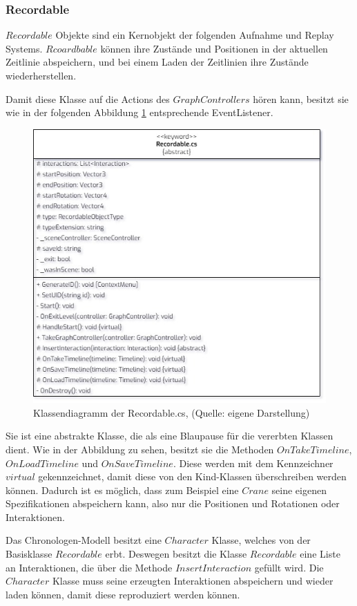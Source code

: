 \subsubsection{Recordable}
$Recordable$ Objekte sind ein Kernobjekt der folgenden Aufnahme und Replay Systems. $Rcoardbable$ können ihre Zustände und Positionen in der aktuellen Zeitlinie abspeichern, und bei einem Laden der Zeitlinien ihre Zustände wiederherstellen.

Damit diese Klasse auf die Actions des $GraphControllers$ hören kann, besitzt sie wie in der folgenden Abbildung \ref{fig:recordable-cs} entsprechende EventListener.

\begin{figure}[ht]
\centering
\includegraphics[width=0.6\linewidth]{content/pictures/Recordable.jpg}
\caption{Klassendiagramm der Recordable.cs, (Quelle: eigene Darstellung)}
\label{fig:recordable-cs}
\end{figure}

Sie ist eine abstrakte Klasse, die als eine Blaupause für die vererbten Klassen dient. Wie in der Abbildung zu sehen, besitzt sie die Methoden $OnTakeTimeline$, \\ $OnLoadTimeline$ und $OnSaveTimeline$. Diese werden mit dem Kennzeichner $virtual$ gekennzeichnet, damit diese von den Kind-Klassen überschreiben werden können. Dadurch ist es möglich, dass zum Beispiel eine $Crane$ seine eigenen Spezifikationen abspeichern kann, also nur die Positionen und Rotationen oder Interaktionen.

Das Chronologen-Modell besitzt eine $Character$ Klasse, welches von der Basisklasse $Recordable$ erbt. Deswegen besitzt die Klasse $Recordable$ eine Liste an Interaktionen, die über die Methode $InsertInteraction$ gefüllt wird. Die $Character$ Klasse muss seine erzeugten Interaktionen abspeichern und wieder laden können, damit diese reproduziert werden können.

